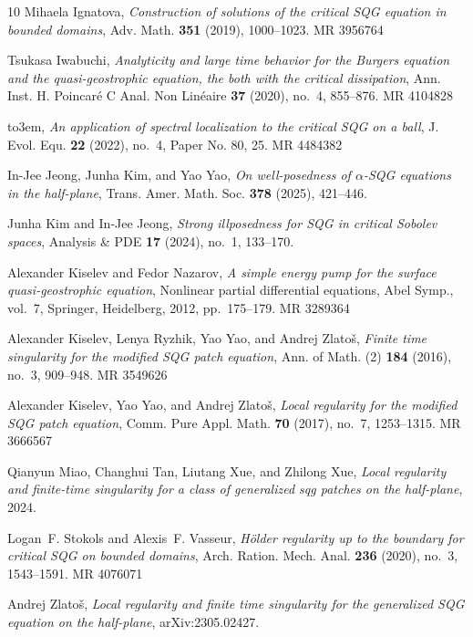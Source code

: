 \documentclass[10pt]{amsart}
\providecommand{\bysame}{\leavevmode\hbox to3em{\hrulefill}\thinspace}
\providecommand{\MR}{\relax\ifhmode\unskip\space\fi MR }
\providecommand{\bysame}{\leavevmode\hbox to3em{\hrulefill}\thinspace}
\providecommand{\MR}{\relax\ifhmode\unskip\space\fi MR }
\theoremstyle{definition}
\theoremstyle{remark}
\numberwithin{equation}{section}
\newcommand{\0}{\emptyset}
\begin{document}
\begin{thebibliography}{10}
			Mihaela Ignatova, \emph{Construction of solutions of the critical {SQG}
				equation in bounded domains}, Adv. Math. \textbf{351} (2019), 1000--1023.
			\MR{3956764}
			
			Tsukasa Iwabuchi, \emph{Analyticity and large time behavior for the {B}urgers
				equation and the quasi-geostrophic equation, the both with the critical
				dissipation}, Ann. Inst. H. Poincar\'e{} C Anal. Non Lin\'eaire \textbf{37}
			(2020), no.~4, 855--876. \MR{4104828}
			
			\bysame, \emph{An application of spectral localization to the critical {SQG} on
				a ball}, J. Evol. Equ. \textbf{22} (2022), no.~4, Paper No. 80, 25.
			\MR{4484382}
			
			In-Jee Jeong, Junha Kim, and Yao Yao, \emph{On well-posedness of
				$\alpha$-{S}{Q}{G} equations in the half-plane}, Trans. Amer. Math. Soc.
			\textbf{378} (2025), 421--446.
			
			Junha Kim and In-Jee Jeong, \emph{Strong illposedness for {S}{Q}{G} in critical
				{S}obolev spaces}, Analysis \& PDE \textbf{17} (2024), no.~1, 133--170.
			
			Alexander Kiselev and Fedor Nazarov, \emph{A simple energy pump for the surface
				quasi-geostrophic equation}, Nonlinear partial differential equations, Abel
			Symp., vol.~7, Springer, Heidelberg, 2012, pp.~175--179. \MR{3289364}
			
			Alexander Kiselev, Lenya Ryzhik, Yao Yao, and Andrej Zlato{\v{s}}, \emph{Finite
				time singularity for the modified {SQG} patch equation}, Ann. of Math. (2)
			\textbf{184} (2016), no.~3, 909--948. \MR{3549626}
			
			Alexander Kiselev, Yao Yao, and Andrej Zlato{\v{s}}, \emph{Local regularity for
				the modified {SQG} patch equation}, Comm. Pure Appl. Math. \textbf{70}
			(2017), no.~7, 1253--1315. \MR{3666567}
			
			Qianyun Miao, Changhui Tan, Liutang Xue, and Zhilong Xue, \emph{Local
				regularity and finite-time singularity for a class of generalized sqg patches
				on the half-plane}, 2024.
			
			Logan~F. Stokols and Alexis~F. Vasseur, \emph{H\"older regularity up to the
				boundary for critical {SQG} on bounded domains}, Arch. Ration. Mech. Anal.
			\textbf{236} (2020), no.~3, 1543--1591. \MR{4076071}
			
			Andrej Zlato{\v{s}}, \emph{Local regularity and finite time singularity for the
				generalized {S}{Q}{G} equation on the half-plane}, arXiv:2305.02427.
			
		\end{thebibliography}
		
		
	
\end{document}
